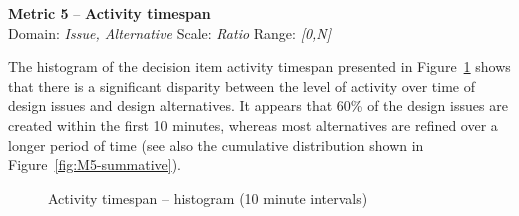\documentclass[article]{elsarticle}
\begin{document}
\clearpage

\noindent
\textbf{Metric 5} -- \textbf{Activity timespan} \\
Domain: \emph{Issue, Alternative} Scale: \emph{Ratio} Range: \emph{[0,N]}

The histogram of the decision item activity timespan presented in Figure~\ref{fig:M5-classes} shows that there is a significant disparity between the level of activity over time of design issues and design alternatives. It appears that 60\% of the design issues are created within the first 10 minutes, whereas most alternatives are refined over a longer period of time (see also the cumulative distribution shown in Figure~\ref{fig:M5-summative}). 

\begin{figure}
  \begin{center}
  \caption{Activity timespan -- histogram (10 minute intervals)}
  \label{fig:M5-classes}
  \end{center}
\end{figure}
\end{document}
